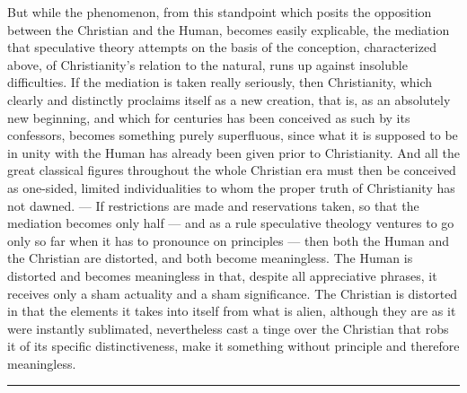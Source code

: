 \documentclass[12pt,a4paper,openany]{book}
\begin{document}
But while the phenomenon, from this standpoint which
posits the opposition between the Christian and the Human,
becomes easily explicable, the mediation that
speculative theory attempts on the basis of the conception, characterized
above, of Christianity's relation to the
natural, runs up against insoluble difficulties. If the mediation
is taken really seriously, then Christianity, which
clearly and distinctly proclaims itself as a new creation, that
is, as an absolutely new beginning, and which for centuries
has been conceived as such by its confessors, becomes something purely superfluous,
since what it is supposed to be in unity with the Human
has already been given prior to Christianity. And all
the great classical figures throughout the whole Christian
era must then be conceived as one-sided, limited individualities
to whom the proper truth of Christianity has not
dawned. --- If restrictions are made and reservations taken,
so that the mediation becomes only half --- and as a rule speculative
theology ventures to go only so far when
it has to pronounce on principles --- then both
the Human and the Christian are distorted, and both become meaningless.
The Human is distorted and becomes meaningless in that,
despite all appreciative phrases, it receives only a sham actuality
and a sham significance. The Christian is distorted
in that the elements it takes into itself from what is alien,
although they are as it were instantly sublimated, nevertheless cast a tinge
over the Christian that robs it of its specific distinctiveness,
make it something without principle and therefore meaningless.

\begin{center}\rule{1.8cm}{0.4pt}\end{center}
\end{document}
